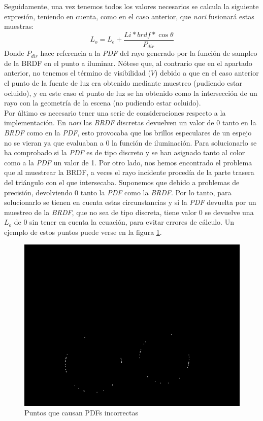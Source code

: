 \documentclass[10pt,oneside,a4paper]{article}
\begin{document}
Seguidamente, una vez tenemos todos los valores necesarios se calcula la siguiente expresión, teniendo en cuenta, como en el caso anterior, que \textit{nori} fusionará estas muestras:
$$L_o = L_e + \frac{Li * brdf *\cos\theta}{P_{dir}}$$
Donde $P_{dir}$ hace referencia a la \textit{PDF} del rayo generado por la función de sampleo de la BRDF en el punto a iluminar. Nótese que, al contrario que en el apartado anterior, no tenemos el término de visibilidad ($V$) debido a que en el caso anterior el punto de la fuente de luz era obtenido mediante muestreo (pudiendo estar ocluido), y en este caso el punto de luz se ha obtenido como la intersección de un rayo con la geometría de la escena (no pudiendo estar ocluido).\\

Por último es necesario tener una serie de consideraciones respecto a la implementación. En \textit{nori} las \textit{BRDF} discretas devuelven un valor de 0 tanto en la \textit{BRDF} como en la \textit{PDF}, esto provocaba que los brillos especulares de un espejo no se vieran ya que evaluaban a 0 la función de iluminación. Para solucionarlo se ha comprobado si la \textit{PDF} es de tipo discreto y se han asignado tanto al color como a la \textit{PDF} un valor de 1. Por otro lado, nos hemos encontrado el problema que al muestrear la BRDF, a veces el rayo incidente procedía de la parte trasera del triángulo con el que intersecaba. Suponemos que debido a problemas de precisión, devolviendo 0 tanto la \textit{PDF} como la \textit{BRDF}. Por lo tanto, para solucionarlo se tienen en cuenta estas circunstancias y si la \textit{PDF} devuelta por un muestreo de la \textit{BRDF}, que no sea de tipo discreta, tiene valor 0 se devuelve una $L_o$ de 0 sin tener en cuenta la ecuación, para evitar errores de cálculo. Un ejemplo de estos puntos puede verse en la figura \ref{fig:diff_ems}.

\begin{figure}[h]
\centering
\includegraphics[width=.6\linewidth]{images/pdfs_incorrectas.png}
\caption{Puntos que causan PDFs incorrectas}
\label{fig:diff_ems}
\end{figure}
\end{document}
